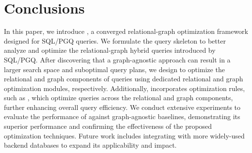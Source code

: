 
\section{Conclusions}
\label{sec:conclusions}

In this paper, we introduce \name, a converged relational-graph optimization framework designed for SQL/PGQ queries. We formulate the \spjm query skeleton to better analyze and optimize the relational-graph hybrid queries introduced by SQL/PGQ. After discovering that a graph-agnostic approach can result in a larger search space and suboptimal query plans, we design \name to optimize the relational and graph components of \spjm queries using dedicated relational and graph optimization modules, respectively. Additionally, \name incorporates optimization rules, such as \filterrule, which optimize queries across the relational and graph components, further enhancing overall query efficiency. We conduct extensive experiments to evaluate the performance of \name against graph-agnostic baselines, demonstrating its superior performance and confirming the effectiveness of the proposed optimization techniques. Future work includes integrating \name with more widely-used backend databases to expand its applicability and impact.

